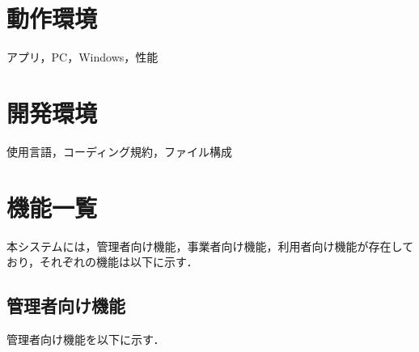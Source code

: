 \documentclass[a4paper, titlepage]{jsarticle}
\begin{document}
\section{動作環境}
アプリ，PC，Windows，性能
\section{開発環境}
使用言語，コーディング規約，ファイル構成

\section{機能一覧}
本システムには，管理者向け機能，事業者向け機能，利用者向け機能が存在しており，それぞれの機能は以下に示す．

\subsection{管理者向け機能}
管理者向け機能を以下に示す．
\end{document}
